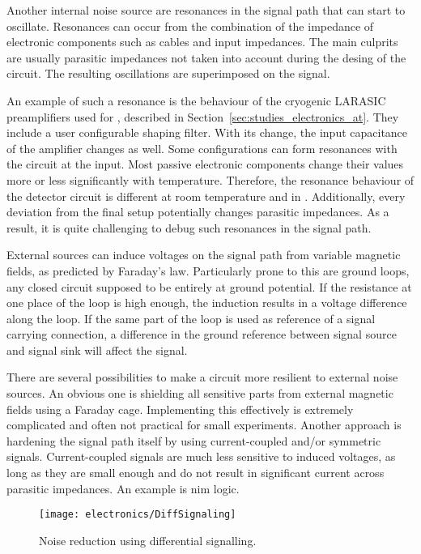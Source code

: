 Another internal noise source are resonances in the signal path that can start to oscillate.
Resonances can occur from the combination of the impedance of electronic components such as cables and input impedances.
The main culprits are usually parasitic impedances not taken into account during the desing of the circuit.
The resulting oscillations are superimposed on the signal.

An example of such a resonance is the behaviour of the cryogenic LARASIC preamplifiers used for \AT{}, described in Section~\ref{sec:studies_electronics_at}.
They include a user configurable shaping filter.
With its change, the input capacitance of the amplifier changes as well.
Some configurations can form resonances with the circuit at the input.
Most passive electronic components change their values more or less significantly with temperature.
Therefore, the resonance behaviour of the detector circuit is different at room temperature and in \lar{}.
Additionally, every deviation from the final setup potentially changes parasitic impedances.
As a result, it is quite challenging to debug such resonances in the signal path.

External sources can induce voltages on the signal path from variable magnetic fields, as predicted by Faraday's law.
Particularly prone to this are ground loops, any closed circuit supposed to be entirely at ground potential.
If the resistance at one place of the loop is high enough, the induction results in a voltage difference along the loop.
If the same part of the loop is used as reference of a signal carrying connection, a difference in the ground reference between signal source and signal sink will affect the signal.

There are several possibilities to make a circuit more resilient to external noise sources.
An obvious one is shielding all sensitive parts from external magnetic fields using a Faraday cage.
Implementing this effectively is extremely complicated and often not practical for small experiments.
Another approach is hardening the signal path itself by using current-coupled and/or symmetric signals.
Current-coupled signals are much less sensitive to induced voltages, as long as they are small enough and do not result in significant current across parasitic impedances.
An example is \gls{nim} logic.

\begin{figure}[htb]
	\centering
	\texttt{[image: electronics/DiffSignaling]}
	\caption[Differential signalling]{%
		Noise reduction using differential signalling.~\cite{diff_signal}
	}
	\label{fig:electronics_diff-signal}
\end{figure}

